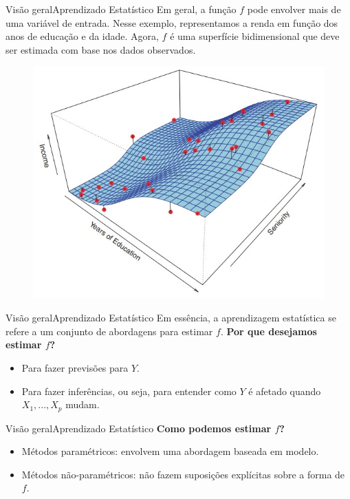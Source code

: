 \documentclass[t]{beamer}
\begin{document}
\begin{ftst}{Visão geral}{{Aprendizado Estatístico}}
\justifying
Em geral, a função $f$ pode envolver mais de uma variável de entrada.
\vone
Nesse exemplo, representamos a renda em função dos anos de educação e da idade.
\vone
Agora, $f$ é uma superfície bidimensional que deve ser estimada com base nos dados observados.

\begin{figure}
    \centering
    \includegraphics[scale=0.3]{Figuras/slide03_07.jpg}
\end{figure}



\end{ftst}


\begin{ftst}{Visão geral}{{Aprendizado Estatístico}}
\justifying
Em essência, a aprendizagem estatística se refere a um conjunto de abordagens para estimar $f$.
\vone
\textbf{Por que desejamos estimar $f$?}
\vone
\begin{itemize}
    \item Para fazer previsões para $Y$.
    \item Para fazer inferências, ou seja, para entender como $Y$ é afetado quando $X_1, ..., X_p$ mudam.
\end{itemize}
\end{ftst}


\begin{ftst}{Visão geral}{{Aprendizado Estatístico}}
\justifying
\textbf{Como podemos estimar $f$?}
\vone
\begin{itemize}
    \item Métodos paramétricos: envolvem uma abordagem baseada em modelo.
    \item Métodos não-paramétricos: não fazem suposições explícitas sobre a forma de $f$. 
\end{itemize}

\end{ftst}
\end{document}
